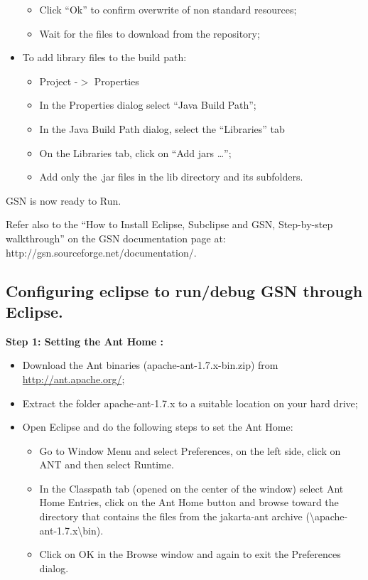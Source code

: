 \begin{itemize}
\begin{itemize}
	\item Click \textquotedblleft{}Ok\textquotedblright{} to confirm overwrite
of non standard resources;
	\item Wait for the files to download from the repository;
\end{itemize}

	\item To add library files to the build path:
\begin{itemize}
	\item Project -\begin{math}>\end{math} Properties
	\item In the Properties dialog select \textquotedblleft{}Java Build
Path\textquotedblright{};
	\item In the Java Build Path dialog, select the
\textquotedblleft{}Libraries\textquotedblright{} tab
	\item On the Libraries tab, click on \textquotedblleft{}Add jars
\ldots{}\textquotedblright{};
	\item Add only the .jar files in the lib directory and its subfolders.
\end{itemize}

\end{itemize}

GSN is now ready to Run.

Refer also to the \textquotedblleft{}How to Install Eclipse, Subclipse
and GSN, Step-by-step walkthrough\textquotedblright{} on the GSN
documentation page at: http://gsn.sourceforge.net/documentation/.

\subsection{Configuring eclipse to run/debug GSN through Eclipse.}

\textbf{Step 1: Setting the Ant Home :}

\begin{itemize}
	\item Download the Ant binaries (apache-ant-1.7.x-bin.zip) from
\url{http://ant.apache.org/};
	\item Extract the folder apache-ant-1.7.x to a suitable location on your
hard drive;
	\item Open Eclipse and do the following steps to set the Ant Home:
\begin{itemize}
	\item Go to Window Menu and select Preferences, on the left side, click on
ANT and then select Runtime.
	\item In the Classpath tab (opened on the center of the window) select Ant
Home Entries, click on the Ant Home button and browse toward the
directory that contains the files from the jakarta-ant archive
(\textbackslash apache-ant-1.7.x\textbackslash bin).
	\item Click on OK in the Browse window and again to exit the Preferences
dialog.
\end{itemize}

\end{itemize}

